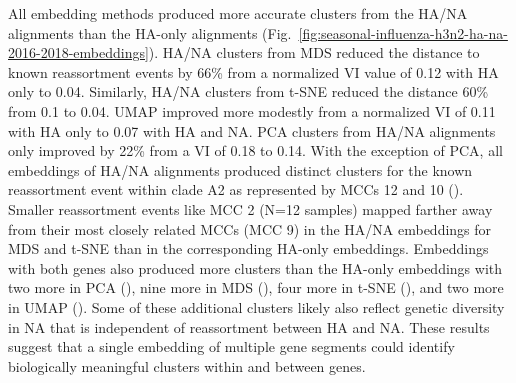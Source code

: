 \documentclass[10pt,letterpaper]{article}
\begin{document}
All embedding methods produced more accurate clusters from the HA/NA alignments than the HA-only alignments (Fig.~\ref{fig:seasonal-influenza-h3n2-ha-na-2016-2018-embeddings}).
HA/NA clusters from MDS reduced the distance to known reassortment events by 66\% from a normalized VI value of 0.12 with HA only to 0.04.
Similarly, HA/NA clusters from t-SNE reduced the distance 60\% from 0.1 to 0.04.
UMAP improved more modestly from a normalized VI of 0.11 with HA only to 0.07 with HA and NA.
PCA clusters from HA/NA alignments only improved by 22\% from a VI of 0.18 to 0.14.
With the exception of PCA, all embeddings of HA/NA alignments produced distinct clusters for the known reassortment event within clade A2 as represented by MCCs 12 and 10 ().
Smaller reassortment events like MCC 2 (N=12 samples) mapped farther away from their most closely related MCCs (MCC 9) in the HA/NA embeddings for MDS and t-SNE than in the corresponding HA-only embeddings.
Embeddings with both genes also produced more clusters than the HA-only embeddings with two more in PCA (), nine more in MDS (), four more in t-SNE (), and two more in UMAP ().
Some of these additional clusters likely also reflect genetic diversity in NA that is independent of reassortment between HA and NA.
These results suggest that a single embedding of multiple gene segments could identify biologically meaningful clusters within and between genes.
\end{document}
